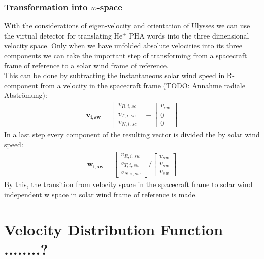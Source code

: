 \subsubsection{Transformation into $w$-space}
With the considerations of eigen-velocity and orientation of Ulysses we can use the virtual detector for translating $\mathrm{He^{+}}$ PHA words into the three dimensional velocity space. Only when we have unfolded absolute velocities into its three components we can take the important step of transforming from a spacecraft frame of reference to a solar wind frame of reference. \\
This can be done by subtracting the instantaneous solar wind speed in R-component from a velocity in the spacecraft frame (TODO: Annahme radiale Abströmung): 
\begin{align*}
\mathbf{v_{i,sw}} = \begin{bmatrix}v_{R,i,sc}\\v_{T,i,sc}\\v_{N,i,sc}\end{bmatrix} - \begin{bmatrix}v_{sw}\\0\\0\end{bmatrix}
\end{align*}
In a last step every component of the resulting vector is divided the by solar wind speed:
\begin{align*}
\mathbf{w_{i,sw}} = \begin{bmatrix}v_{R,i,sw}\\v_{T,i,sw}\\v_{N,i,sw}\end{bmatrix} / \begin{bmatrix}v_{sw}\\v_{sw}\\v_{sw}\end{bmatrix}
\end{align*}
By this, the transition from velocity space in the spacecraft frame to solar wind independent w space in solar wind frame of reference is made.
%
%
%
\section{Velocity Distribution Function ........?}

%
